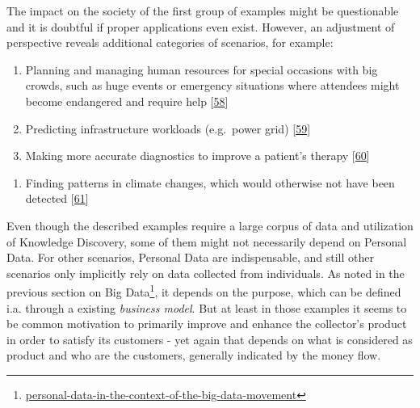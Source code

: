 \documentclass[12pt,english,a4paper,titlepage,cleardoublepage=empty,dottedtoc]{report}
\renewcommand{\href}[2]{#2\footnote{\url{#1}}}
\providecommand{\tightlist}{%
  \setlength{\itemsep}{0pt}\setlength{\parskip}{0pt}}
\begin{document}
The impact on the society of the first group of examples might be
questionable and it is doubtful if proper applications even exist.
However, an adjustment of perspective reveals additional categories of
scenarios, for example:

\begin{enumerate}
\def\labelenumi{(\Alph{enumi})}
\setcounter{enumi}{3}
\item
  Planning and managing human resources for special occasions with big
  crowds, such as huge events or emergency situations where attendees
  might become endangered and require help
  {[}\protect\hyperlink{ref-estimating-the-locations-of-emergency-events-from-twitter-streams_2014}{58}{]}
\item
  Predicting infrastructure workloads (e.g.~power grid)
  {[}\protect\hyperlink{ref-paper_2015_improving-power-grid-monitoring-data-quality-an-efficient-machine-learning-framework-for-missing-data-prediction}{59}{]}
\item
  Making more accurate diagnostics to improve a patient's therapy
  {[}\protect\hyperlink{ref-the-practice-of-predictive-analytics-in-healthcare_2013}{60}{]}
\end{enumerate}

\begin{enumerate}
\def\labelenumi{\Alph{enumi})}
\setcounter{enumi}{6}
\tightlist
\item
  Finding patterns in climate changes, which would otherwise not have
  been detected
  {[}\protect\hyperlink{ref-data-collection-for-climate-changes_2014}{61}{]}
\end{enumerate}

Even though the described examples require a large corpus of data and
utilization of Knowledge Discovery, some of them might not necessarily
depend on Personal Data. For other scenarios, Personal Data are
indispensable, and still other scenarios only implicitly rely on data
collected from individuals. As noted in the
\href{personal-data-in-the-context-of-the-big-data-movement}{previous
section on Big Data}, it depends on the purpose, which can be defined
i.a. through a existing \emph{business model}. But at least in those
examples it seems to be common motivation to primarily improve and
enhance the collector's product in order to satisfy its customers - yet
again that depends on what is considered as product and who are the
customers, generally indicated by the money flow.
\end{document}
